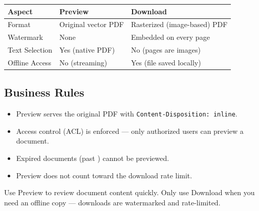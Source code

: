 \begin{tabularx}{\textwidth}{@{} l X X @{}}
  \toprule
  \textbf{Aspect} & \textbf{Preview}
    & \textbf{Download} \\
  \midrule
  Format
    & Original vector PDF
    & Rasterized (image-based) PDF \\
  Watermark
    & None
    & Embedded on every page \\
  Text Selection
    & Yes (native PDF)
    & No (pages are images) \\
  Offline Access
    & No (streaming)
    & Yes (file saved locally) \\
  \bottomrule
\end{tabularx}

\subsection{Business Rules}
\begin{itemize}[leftmargin=18pt]
  \item Preview serves the original PDF with
        \texttt{Content-Disposition: inline}.
  \item Access control (ACL) is enforced --- only authorized
        users can preview a document.
  \item Expired documents (past ) cannot
        be previewed.
  \item Preview does not count toward the download rate limit.
\end{itemize}

\begin{ugTip}
  Use Preview to review document content quickly. Only use
  Download when you need an offline copy --- downloads are
  watermarked and rate-limited.
\end{ugTip}

\newpage
